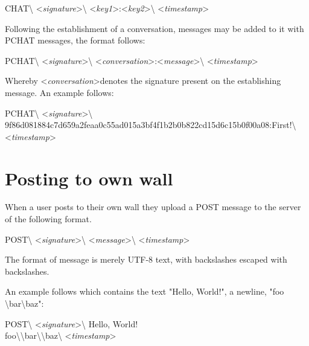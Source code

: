 \begin{center}
CHAT\textbackslash
\textless \textit{signature}\textgreater\textbackslash
\textless \textit{key1}\textgreater:\textless \textit{key2}\textgreater\textbackslash
\textless \textit{timestamp}\textgreater
\end{center}

Following the establishment of a conversation, messages may be added to it with
PCHAT messages, the format follows:

\begin{center}
PCHAT\textbackslash
\textless \textit{signature}\textgreater\textbackslash
\textless \textit{conversation}\textgreater:\textless \textit{message}\textgreater\textbackslash
\textless \textit{timestamp}\textgreater
\end{center}

Whereby \textless \textit{conversation}\textgreater denotes the signature
present on the establishing message. An example follows:

\begin{center}
PCHAT\textbackslash
\textless \textit{signature}\textgreater\textbackslash
9f86d081884c7d659a2feaa0c55ad015a3bf4f1b2b0b822cd15d6c15b0f00a08:First!\textbackslash
\textless \textit{timestamp}\textgreater
\end{center}

\section{Posting to own wall}
When a user posts to their own wall they upload a POST message to the server of
the following format.

\begin{center}
POST\textbackslash
\textless \textit{signature}\textgreater\textbackslash
\textless \textit{message}\textgreater\textbackslash
\textless \textit{timestamp}\textgreater
\end{center}

The format of message is merely UTF-8 text, with backslashes escaped with
backslashes.

An example follows which contains the text "Hello, World!", a newline, "foo
\textbackslash bar\textbackslash baz":

\begin{center}
POST\textbackslash
\textless \textit{signature}\textgreater\textbackslash
Hello, World!\\
foo\textbackslash\textbackslash bar\textbackslash\textbackslash baz\textbackslash
\textless \textit{timestamp}\textgreater
\end{center}

